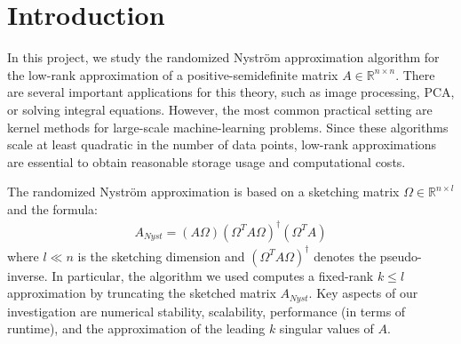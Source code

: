\documentclass{article}
\date{\today}
\theoremstyle{definition}
\begin{document}
\hypersetup{pageanchor=false}


\clearpage
\thispagestyle{empty}
\tableofcontents

\clearpage
\hypersetup{pageanchor=true} %
\setcounter{page}{1}

\section{Introduction}
In this project, we study the randomized Nyström approximation algorithm for the low-rank approximation of a positive-semidefinite matrix $A\in \mathbb{R}^{n \times n}$. There are several important applications for this theory, such as image processing, PCA, or solving integral equations. However, the most common practical setting are kernel methods for large-scale machine-learning problems. Since these algorithms scale at least quadratic in the number of data points, low-rank approximations are essential to obtain reasonable storage usage and computational costs. 

The randomized Nyström approximation is based on a sketching matrix $\Omega \in \mathbb{R}^{n \times l}$ and the formula:
\begin{align}
    \label{nyst:sketching_formula}
    A_{Nyst} = (A \Omega) (\Omega^T A \Omega)^\dagger (\Omega^T A)
\end{align}
where $l \ll n$ is the sketching dimension and $(\Omega^T A \Omega)^\dagger$ denotes the pseudo-inverse. In particular, the algorithm we used computes a fixed-rank $k \leq l$ approximation by truncating the sketched matrix $A_{Nyst}$. Key aspects of our investigation are numerical stability, scalability, performance (in terms of runtime), and the approximation of the leading $k$ singular values of $A$.
\end{document}
